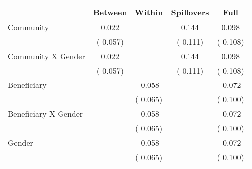 
\begin{tabular}{l*{4}{c}}\hline&\multicolumn{1}{c}{Between}&\multicolumn{1}{c}{Within}&\multicolumn{1}{c}{Spillovers}&\multicolumn{1}{c}{Full}\\ \hline
 Community                                     &              0.022      &                                               &        0.144 &         0.098                            \\ 
                                                       &        (       0.057)           &                                       &       (       0.111)     &      (       0.108)                                           \\ 
 Community X Gender            &              0.022      &                                               &        0.144 &         0.098                            \\ 
                                                       &        (       0.057)           &                                       &       (       0.111)     &      (       0.108)                                           \\ 
 Beneficiary                           &                                               &       -0.058    &                                &            -0.072                            \\ 
                                                       &                                               & (       0.065)                  &                                        &      (       0.100)                                           \\ 
 Beneficiary X Gender          &                                               &       -0.058    &                                &            -0.072                            \\ 
                                                       &                                               & (       0.065)                  &                                        &      (       0.100)                                           \\ 
 Gender                                        &                              &       -0.058    &                                &            -0.072                            \\ 
                                                       &                                               & (       0.065)                  &                                        &      (       0.100)                                           \\ 

\end{tabular}
